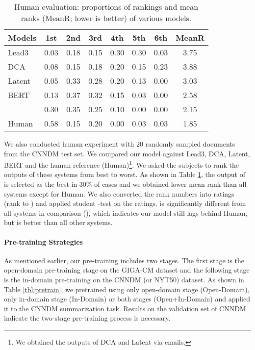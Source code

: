 \documentclass[11pt,a4paper]{article}
\begin{document}
\begin{table}[t]
	\centering
	\small
	\setlength\tabcolsep{3.5pt} 
	\begin{tabular}[t]{| l | c c c c c c | c |}
		\hline
		Models & 1st & 2nd & 3rd & 4th & 5th & 6th & MeanR \\
		\hline
		\hline
		Lead3 & 0.03 & 0.18 & 0.15 & 0.30 & 0.30 & 0.03 & 3.75 \\
		DCA & 0.08 & 0.15 & 0.18 & 0.20 & 0.15 & 0.23 & 3.88 \\ 
		Latent & 0.05 & 0.33 & 0.28 & 0.20 & 0.13 & 0.00 & 3.03 \\
		BERT & 0.13 & 0.37 & 0.32 & 0.15 &  0.03 & 0.00 & 2.58 \\
		  & 0.30  & 0.35  & 0.25 & 0.10 & 0.00 & 0.00 & 2.15  \\
		Human  & 0.58 & 0.15 & 0.20 & 0.00 & 0.03 & 0.03 & 1.85 \\
		\hline
	\end{tabular}
	\caption{Human evaluation: proportions of rankings and mean ranks (MeanR; lower is better) of various models.}
	\label{tbl:human}
\end{table}

We also conducted human experiment with 20 randomly sampled documents from the CNNDM test set. We compared our model  against Lead3, DCA, Latent, BERT and the human reference (Human)\footnote{We obtained the outputs of DCA and Latent via emails.}. We asked the subjects to rank the outputs of these systems from best to worst. As shown in Table \ref{tbl:human}, the output of  is selected as the best in 30\% of cases and we obtained lower mean rank than all systems except for \mbox{Human}. We also converted the rank numbers into ratings (rank  to ) and applied student -test on the ratings.  is significantly different from all systems in comparison (), which indicates our model still lags behind Human, but is better than all other systems.

\paragraph{Pre-training Strategies}
As mentioned earlier, our pre-training includes two stages. The first stage is the open-domain pre-training stage on the GIGA-CM dataset and the following stage is the in-domain pre-training on the \mbox{CNNDM} (or NYT50) dataset. As shown in Table \ref{tbl:pretrain}, we pretrained  using only open-domain stage (Open-Domain), only in-domain stage (In-Domain) or both stages (Open+In-Domain) and applied it to the CNNDM summarization task. Results on the validation set of CNNDM indicate the two-stage pre-training process is necessary.
\end{document}
